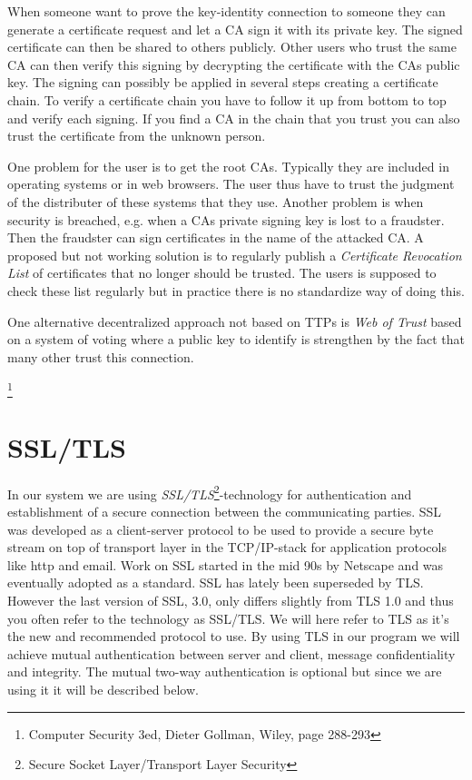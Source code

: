 \documentclass[10pt, a4paper]{article}
\begin{document}
When someone want to prove the key-identity connection to someone they can generate a certificate request and let a CA sign it with its private key. The signed certificate can then be shared to others publicly. Other users who trust the same CA can then verify this signing by decrypting the certificate with the CAs public key. The signing can possibly be applied in several steps creating a certificate chain. To verify a certificate chain you have to follow it up from bottom to top and verify each signing. If you find a CA in the chain that you trust you can also trust the certificate from the unknown person.

One problem for the user is to get the root CAs. Typically they are included in operating systems or in web browsers. The user thus have to trust the judgment of the distributer of these systems that they use. Another problem is when security is breached, e.g. when a CAs private signing key is lost to a fraudster. Then the fraudster can sign certificates in the name of the attacked CA. A proposed but not working solution is to regularly publish a \emph{Certificate Revocation List} of certificates that no longer should be trusted. The users is supposed to check these list regularly but in practice there is no standardize way of doing this.

One alternative decentralized approach not based on TTPs is \emph{Web of Trust} based on a system of voting where a public key to identify is strengthen by the fact that many other trust this connection.

\footnote{Computer Security 3ed, Dieter Gollman, Wiley, page 288-293}

\section{SSL/TLS}
\label{sec+tls}
In our system we are using \emph{SSL/TLS}\footnote{Secure Socket Layer/Transport Layer Security}-technology for authentication and establishment of a secure connection between the communicating parties. SSL was developed as a client-server protocol to be used to provide a secure byte stream on top of transport layer in the TCP/IP-stack for application protocols like http and email. Work on SSL started in the mid 90s by Netscape and was eventually adopted as a standard. SSL has lately been superseded by TLS. However the last version of SSL, 3.0, only differs slightly from TLS 1.0 and thus you often refer to the technology as SSL/TLS. We will here refer to TLS as it's the new  and recommended protocol to use. By using TLS in our program we will achieve mutual authentication between server and client, message confidentiality and integrity. The mutual two-way authentication is optional but since we are using it it will be described below.
\end{document}
